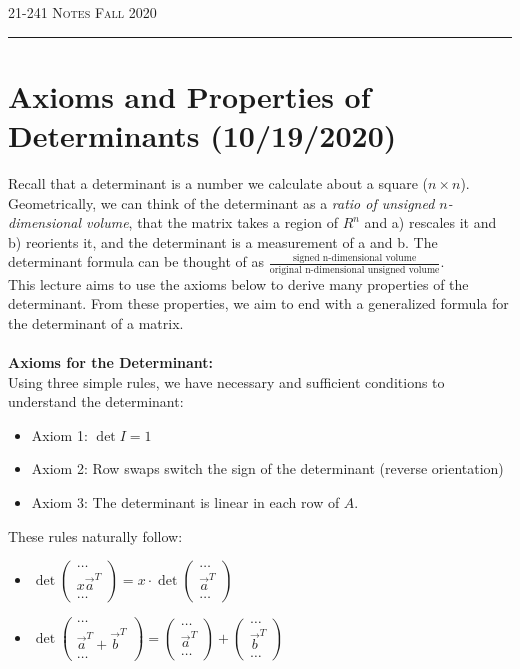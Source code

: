 \documentclass[12pt]{amsart}
\begin{document}
\thispagestyle{empty}

{\scshape 21-241} \hfill {\scshape \Large Notes} \hfill {\scshape Fall 2020}
\medskip
\hrule
\bigskip

\section*{Axioms and Properties of Determinants (10/19/2020)}

Recall that a determinant is a number we calculate about a square ($n \times n$). Geometrically, we can think of the determinant as a \textit{ratio of unsigned $n$-dimensional volume}, that the matrix takes a region of $R^n$ and a) rescales it and b) reorients it, and the determinant is a measurement of a and b. The determinant formula can be thought of as $\frac{\text{signed n-dimensional volume}}{\text{original n-dimensional unsigned volume}}$.\\
This lecture aims to use the axioms below to derive many properties of the determinant. From these properties, we aim to end with a generalized formula for the determinant of a matrix.\\
\\
\textbf{Axioms for the Determinant:}\\
Using three simple rules, we have necessary and sufficient conditions to understand the determinant:
\begin{itemize}
	\item Axiom 1: $\det I = 1$
	\item Axiom 2: Row swaps switch the sign of the determinant (reverse orientation)
	\item Axiom 3: The determinant is linear in each row of $A$.
\end{itemize}
These rules naturally follow:
\begin{itemize}
	\item $\det \begin{pmatrix}\dots\\x\vec{a}^T\\\dots\end{pmatrix} = x \cdot \det \begin{pmatrix}\dots\\\vec{a}^T\\\dots\end{pmatrix}$\\
	\item $\det \begin{pmatrix}\dots\\\vec{a}^T + \vec{b}^T\\\dots\end{pmatrix} = \begin{pmatrix}\dots\\\vec{a}^T\\\dots\end{pmatrix} + \begin{pmatrix}\dots\\\vec{b}^T\\\dots\end{pmatrix}$
\end{itemize}
\end{document}
